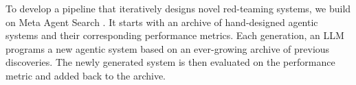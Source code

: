 To develop a pipeline that iteratively designs novel red-teaming systems, we build on Meta Agent Search \citep{hu2025automateddesignagenticsystems}. It starts with an archive of hand-designed agentic systems and their corresponding performance metrics. Each generation, an LLM programs a new agentic system based on an ever-growing archive of previous discoveries. The newly generated system is then evaluated on the performance metric and added back to the archive.





